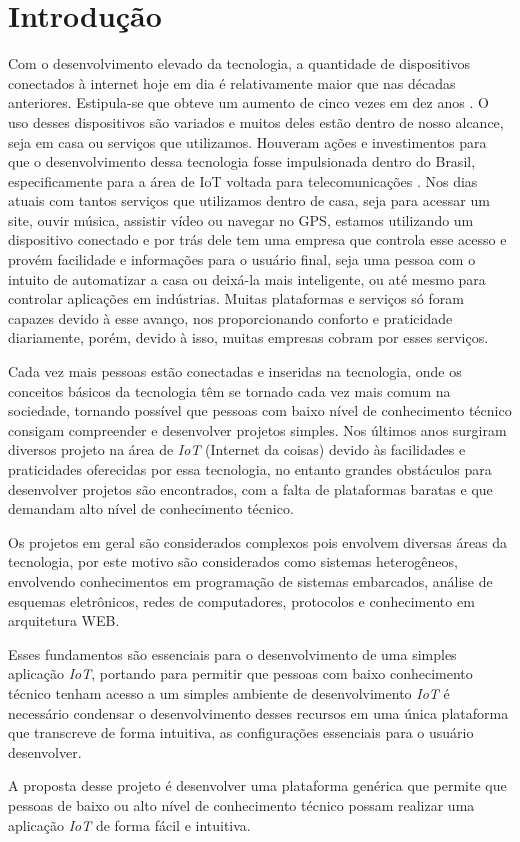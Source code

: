 \documentclass[../../layout.tex]{subfiles}
\begin{document}
\chapter{Introdução}
\hspace*{3em}Com o desenvolvimento elevado da tecnologia, a quantidade de dispositivos conectados à internet hoje em dia é relativamente maior que nas décadas anteriores. Estipula-se que obteve um aumento de cinco vezes em dez anos . O uso desses dispositivos são variados e muitos deles estão dentro de nosso alcance, seja em casa ou serviços que utilizamos. Houveram ações e investimentos para que o desenvolvimento dessa tecnologia fosse impulsionada dentro do Brasil, especificamente para a área de IoT voltada para telecomunicações . Nos dias atuais com tantos serviços que utilizamos dentro de casa, seja para acessar um site, ouvir música, assistir vídeo ou navegar no GPS, estamos utilizando um dispositivo conectado e por trás dele tem uma empresa que controla esse acesso e provém facilidade e informações para o usuário final, seja uma pessoa com o intuito de automatizar a casa ou deixá-la mais inteligente, ou até mesmo para controlar aplicações em indústrias. Muitas plataformas e serviços só foram capazes devido à esse avanço, nos proporcionando conforto e praticidade diariamente, porém, devido à isso, muitas empresas cobram por esses serviços.\par
Cada vez mais pessoas estão conectadas e inseridas na tecnologia, onde os conceitos básicos da tecnologia têm se tornado cada vez mais comum na sociedade, tornando possível  que pessoas com baixo nível de conhecimento técnico consigam compreender e desenvolver projetos simples. Nos últimos anos surgiram diversos projeto na área de \emph{IoT} (Internet da coisas) devido às facilidades e praticidades oferecidas por essa tecnologia, no entanto grandes obstáculos para desenvolver projetos são encontrados, com a falta de plataformas baratas e que demandam alto nível de conhecimento técnico.\par
Os projetos em geral são considerados complexos pois envolvem diversas áreas da tecnologia, por este motivo são considerados como sistemas heterogêneos, envolvendo conhecimentos em programação de sistemas embarcados, análise de esquemas eletrônicos, redes de computadores, protocolos e conhecimento em arquitetura WEB. \par
Esses fundamentos são essenciais para o desenvolvimento de uma simples aplicação \emph{IoT}, portando para permitir que pessoas com baixo conhecimento técnico tenham acesso a um simples ambiente de desenvolvimento \emph{IoT} é necessário condensar o desenvolvimento desses recursos em uma única plataforma que transcreve de forma intuitiva, as configurações essenciais para o usuário desenvolver.\cite{IoTeveryone} \par
A proposta desse projeto é desenvolver uma plataforma genérica que permite que pessoas de baixo ou alto nível de conhecimento técnico possam realizar uma aplicação \emph{IoT} de forma fácil e intuitiva.
\end{document}
